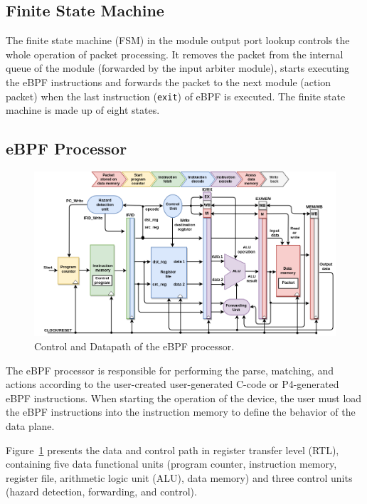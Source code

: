 \subsection{Finite State Machine}

The finite state machine (FSM) in the module output port lookup controls the whole operation of packet processing. It removes the packet from the internal queue of the module (forwarded by the input arbiter module), starts executing the eBPF instructions and forwards the packet to the next module (action packet) when the last instruction (\texttt{exit}) of eBPF is executed. The finite state machine is made up of eight states.

\subsection{eBPF Processor}

\begin{figure}[hbt]
\centering
\includegraphics[width=.9\textwidth]{figures/06_fig02.png}
\caption{Control and Datapath of the eBPF processor.}
\label{fig:06_fig02}
\end{figure}


The eBPF processor is responsible for performing the parse, matching, and actions according to the user-created user-generated C-code or P4-generated eBPF instructions. When starting the operation of the device, the user must load the eBPF instructions into the instruction memory to define  the behavior of the data plane.

Figure~\ref{fig:06_fig02} presents the data and control path in register transfer level (RTL), containing five data functional units (program counter, instruction memory, register file, arithmetic logic unit (ALU), data memory) and three control units (hazard detection, forwarding, and control).

